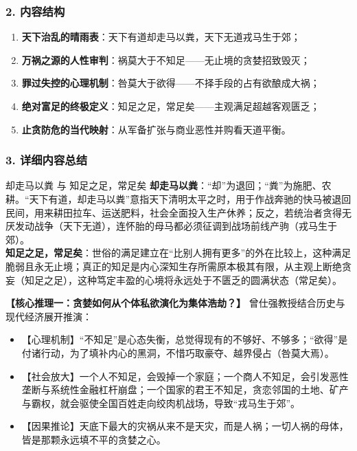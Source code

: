 \subsubsection{2. 内容结构}
\begin{enumerate}
    \item \textbf{天下治乱的晴雨表}：天下有道却走马以粪，天下无道戎马生于郊；
    \item \textbf{万祸之源的人性审判}：祸莫大于不知足——无止境的贪婪招致毁灭；
    \item \textbf{罪过失控的心理机制}：咎莫大于欲得——不择手段的占有欲酿成大祸；
    \item \textbf{绝对富足的终极定义}：知足之足，常足矣——主观满足超越客观匮乏；
    \item \textbf{止贪防危的当代映射}：从军备扩张与商业恶性并购看天道平衡。
\end{enumerate}

\subsubsection{3. 详细内容总结}

\begin{ConceptBox}{却走马以粪 与 知足之足，常足矣}
\textbf{却走马以粪}：“却”为退回；“粪”为施肥、农耕。“天下有道，却走马以粪”意指天下清明太平之时，用于作战奔驰的快马被退回民间，用来耕田拉车、运送肥料，社会全面投入生产休养；反之，若统治者贪得无厌发动战争（天下无道），连怀胎的母马都必须征调到战场前线产驹（戎马生于郊）。\\
\textbf{知足之足，常足矣}：世俗的满足建立在“比别人拥有更多”的外在比较上，这种满足脆弱且永无止境；真正的知足是内心深知生存所需原本极其有限，从主观上断绝贪妄（知足之足），这种笃定丰盈的心境将永远处于不匮乏的圆满状态（常足矣）。
\end{ConceptBox}

\noindent\textbf{【核心推理一：贪婪如何从个体私欲演化为集体浩劫？】}
曾仕强教授结合历史与现代经济展开推演：
\begin{itemize}
    \item 【心理机制】“不知足”是心态失衡，总觉得现有的不够好、不够多；“欲得”是付诸行动，为了填补内心的黑洞，不惜巧取豪夺、越界侵占（咎莫大焉）。
    \item 【社会放大】一个人不知足，会毁掉一个家庭；一个商人不知足，会引发恶性垄断与系统性金融杠杆崩盘；一个国家的君王不知足，贪恋邻国的土地、矿产与霸权，就会驱使全国百姓走向绞肉机战场，导致“戎马生于郊”。
    \item 【因果推论】天底下最大的灾祸从来不是天灾，而是人祸；一切人祸的母体，皆是那颗永远填不平的贪婪之心。
\end{itemize}

